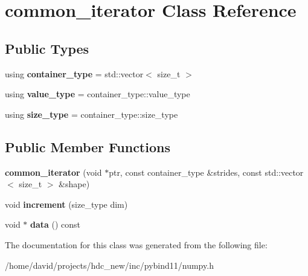 \hypertarget{classcommon__iterator}{}\section{common\+\_\+iterator Class Reference}
\label{classcommon__iterator}
\subsection*{Public Types}
\begin{DoxyCompactItemize}
\item 
using {\bfseries container\+\_\+type} = std\+::vector$<$ size\+\_\+t $>$\hypertarget{classcommon__iterator_aceb47737a94ffff1d04048900eced874}{}\label{classcommon__iterator_aceb47737a94ffff1d04048900eced874}

\item 
using {\bfseries value\+\_\+type} = container\+\_\+type\+::value\+\_\+type\hypertarget{classcommon__iterator_ae5c71809ed30d20b321bf01f4043142e}{}\label{classcommon__iterator_ae5c71809ed30d20b321bf01f4043142e}

\item 
using {\bfseries size\+\_\+type} = container\+\_\+type\+::size\+\_\+type\hypertarget{classcommon__iterator_a1b9c8bc2b0275b8b9b6f5410b6f96148}{}\label{classcommon__iterator_a1b9c8bc2b0275b8b9b6f5410b6f96148}

\end{DoxyCompactItemize}
\subsection*{Public Member Functions}
\begin{DoxyCompactItemize}
\item 
{\bfseries common\+\_\+iterator} (void $\ast$ptr, const container\+\_\+type \&strides, const std\+::vector$<$ size\+\_\+t $>$ \&shape)\hypertarget{classcommon__iterator_a82e0f90dbcd6d3053760e8b1aeca5ea6}{}\label{classcommon__iterator_a82e0f90dbcd6d3053760e8b1aeca5ea6}

\item 
void {\bfseries increment} (size\+\_\+type dim)\hypertarget{classcommon__iterator_a6f54104a4b0847b87bab424db09b85d7}{}\label{classcommon__iterator_a6f54104a4b0847b87bab424db09b85d7}

\item 
void $\ast$ {\bfseries data} () const \hypertarget{classcommon__iterator_a2feda2dc476a3bd0a72117b253d3d7c6}{}\label{classcommon__iterator_a2feda2dc476a3bd0a72117b253d3d7c6}

\end{DoxyCompactItemize}


The documentation for this class was generated from the following file\+:\begin{DoxyCompactItemize}
\item 
/home/david/projects/hdc\+\_\+new/inc/pybind11/numpy.\+h\end{DoxyCompactItemize}
